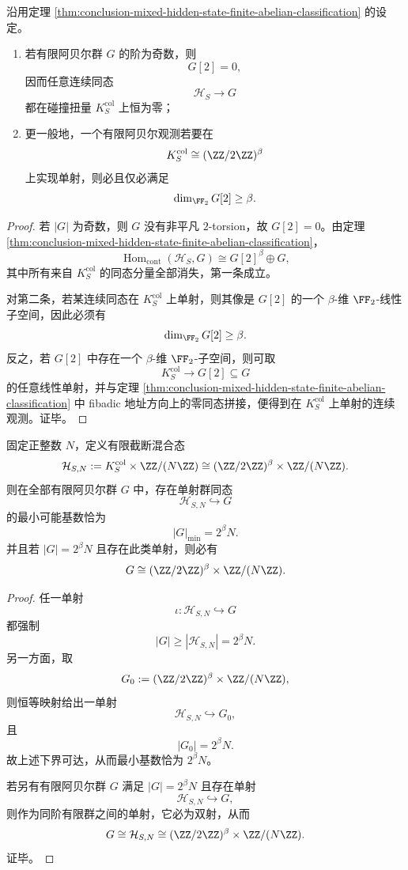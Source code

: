 \begin{corollary}\label{cor:conclusion-mixed-hidden-state-odd-order-blindness}
沿用定理 \ref{thm:conclusion-mixed-hidden-state-finite-abelian-classification} 的设定。
\begin{enumerate}
  \item 若有限阿贝尔群 \(G\) 的阶为奇数，则
  \[
  G[2]=0,
  \]
  因而任意连续同态
  \[
  \mathcal H_S\to G
  \]
  都在碰撞扭量 \(K_S^{\mathrm{col}}\) 上恒为零；
  \item 更一般地，一个有限阿贝尔观测若要在
  \[
  K_S^{\mathrm{col}}\cong (\ZZ/2\ZZ)^\beta
  \]
  上实现单射，则必且仅必满足
  \[
  \dim_{\FF_2}G[2]\ge \beta.
  \]
\end{enumerate}
\end{corollary}
\begin{proof}
若 \(|G|\) 为奇数，则 \(G\) 没有非平凡 \(2\)-torsion，故 \(G[2]=0\)。由定理 \ref{thm:conclusion-mixed-hidden-state-finite-abelian-classification}，
\[
\operatorname{Hom}_{\mathrm{cont}}(\mathcal H_S,G)\cong G[2]^\beta\oplus G,
\]
其中所有来自 \(K_S^{\mathrm{col}}\) 的同态分量全部消失，第一条成立。

对第二条，若某连续同态在 \(K_S^{\mathrm{col}}\) 上单射，则其像是 \(G[2]\) 的一个 \(\beta\)-维 \(\FF_2\)-线性子空间，因此必须有
\[
\dim_{\FF_2}G[2]\ge \beta.
\]
反之，若 \(G[2]\) 中存在一个 \(\beta\)-维 \(\FF_2\)-子空间，则可取
\[
K_S^{\mathrm{col}}\to G[2]\subseteq G
\]
的任意线性单射，并与定理 \ref{thm:conclusion-mixed-hidden-state-finite-abelian-classification} 中 fibadic 地址方向上的零同态拼接，便得到在 \(K_S^{\mathrm{col}}\) 上单射的连续观测。证毕。
\end{proof}

\begin{theorem}[固定导体下混合隐藏态的最小有限受体]\label{thm:conclusion-mixed-hidden-state-minimal-finite-receiver}
固定正整数 \(N\)，定义有限截断混合态
\[
\mathcal H_{S,N}:=K_S^{\mathrm{col}}\times \ZZ/(N\ZZ)
\cong
(\ZZ/2\ZZ)^\beta\times \ZZ/(N\ZZ).
\]
则在全部有限阿贝尔群 \(G\) 中，存在单射群同态
\[
\mathcal H_{S,N}\hookrightarrow G
\]
的最小可能基数恰为
\[
|G|_{\min}=2^\beta N.
\]
并且若 \(|G|=2^\beta N\) 且存在此类单射，则必有
\[
G\cong (\ZZ/2\ZZ)^\beta\times \ZZ/(N\ZZ).
\]
\end{theorem}
\begin{proof}
任一单射
\[
\iota:\mathcal H_{S,N}\hookrightarrow G
\]
都强制
\[
|G|\ge |\mathcal H_{S,N}|=2^\beta N.
\]
另一方面，取
\[
G_0:=(\ZZ/2\ZZ)^\beta\times \ZZ/(N\ZZ),
\]
则恒等映射给出一单射
\[
\mathcal H_{S,N}\hookrightarrow G_0,
\]
且
\[
|G_0|=2^\beta N.
\]
故上述下界可达，从而最小基数恰为 \(2^\beta N\)。

若另有有限阿贝尔群 \(G\) 满足 \(|G|=2^\beta N\) 且存在单射
\[
\mathcal H_{S,N}\hookrightarrow G,
\]
则作为同阶有限群之间的单射，它必为双射，从而
\[
G\cong \mathcal H_{S,N}\cong (\ZZ/2\ZZ)^\beta\times \ZZ/(N\ZZ).
\]
证毕。
\end{proof}

